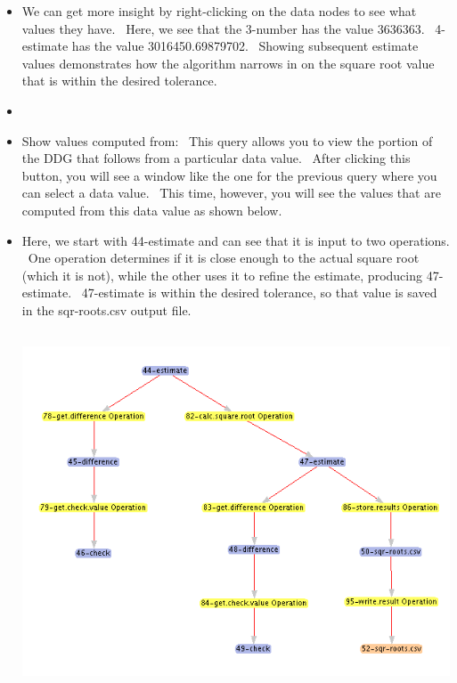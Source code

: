 \documentclass[letterpaper]{article}
\newcommand\liststyleWWviiiNumiv{%
\renewcommand\labelitemi{←}
\renewcommand\labelitemii{•}
\renewcommand\labelitemiii{•}
\renewcommand\labelitemiv{•}
}
\newcommand\liststyleWWviiiNumv{%
\renewcommand\labelitemi{•}
\renewcommand\labelitemii{•}
\renewcommand\labelitemiii{•}
\renewcommand\labelitemiv{•}
}
\newcommand\liststyleWWviiiNumvi{%
\renewcommand\labelitemi{←}
\renewcommand\labelitemii{•}
\renewcommand\labelitemiii{•}
\renewcommand\labelitemiv{•}
}
\begin{document}
\liststyleWWviiiNumiv
\begin{itemize}
\item {\color{black}
We can get more insight by right-clicking on the data nodes to see what values they have. \ Here, we see that the 3-number has the value 3636363. \ 4-estimate has the value 3016450.69879702. \ Showing subsequent estimate values demonstrates how the algorithm narrows in on the square root value that is within the desired tolerance.}
\item \clearpage
\bigskip
\end{itemize}
\liststyleWWviiiNumv
\begin{itemize}
\item {\color{black}
Show values computed from: \ This query allows you to view the portion of the DDG that follows from a particular data value. \ After clicking this button, you will see a window like the one for the previous query where you can select a data value. \ This time, however, you will see the values that are computed from this data value as shown below.}
\end{itemize}
\liststyleWWviiiNumvi
\begin{itemize}
\item {\color{black}
Here, we start with 44-estimate and can see that it is input to two operations. \ One operation determines if it is close enough to the actual square root (which it is not), while the other uses it to refine the estimate, producing 47-estimate. \ 47-estimate is within the desired tolerance, so that value is saved in the sqr-roots.csv output file. \includegraphics[width=5.8335in,height=4.4909in]{UsingDDGExplorer-img/UsingDDGExplorer-img009.png} }
\end{itemize}
\end{document}
